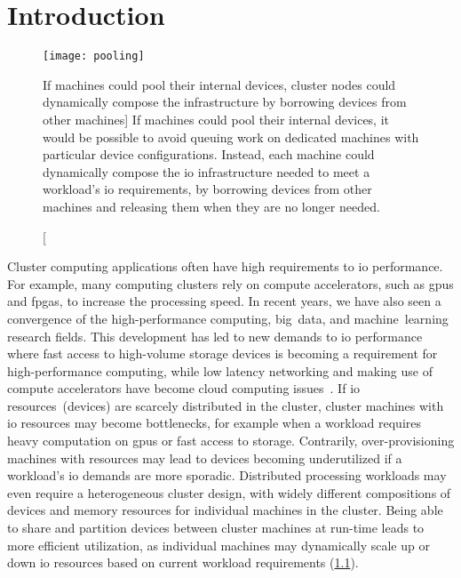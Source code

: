 \chapter{Introduction}\label{chapter:intro}

\begin{figure}
	\centering
	\texttt{[image: pooling]}
    \caption
    [If machines could pool their internal devices, cluster nodes could dynamically compose the  infrastructure by borrowing devices from other machines]
    {If machines could pool their internal devices, it would be possible to avoid queuing work on dedicated machines with particular device configurations. Instead, each machine could dynamically compose the \gls{io} infrastructure needed to meet a workload's \gls{io} requirements, by borrowing devices from other machines and releasing them when they are no longer needed.}
    \label{fig:device-pool}
\end{figure}

Cluster computing applications often have high requirements to \gls{io} performance.
%
For example, many computing clusters rely on compute accelerators, such as \glspl{gpu} and \glspl{fpga}, to increase the processing speed.
%
In recent years, we have also seen a convergence of the high-performance computing, big~data, and machine~learning research fields.
%
This development has led to new demands to \gls{io} performance where fast access to high-volume storage devices is becoming a requirement for high-performance computing, while low latency networking and making use of compute accelerators have become cloud computing issues~\cite{Trivedi2011,Coates2013,Taherkordi2018}.
%
If \gls{io} resources~(devices) are scarcely distributed in the cluster, cluster machines with \gls{io} resources may become bottlenecks, for example when a workload requires heavy computation on \glspl{gpu} or fast access to storage.
%
Contrarily, over-provisioning machines with resources may lead to devices becoming underutilized if a workload's \gls{io} demands are more sporadic.
%
Distributed processing workloads may even require a heterogeneous cluster design, with widely different compositions of devices and memory resources for individual machines in the cluster.
%
Being able to share and partition devices between cluster machines at run-time leads to more efficient utilization, as individual machines may dynamically scale up or down \gls{io} resources based on current workload requirements (\cref{fig:device-pool}).



